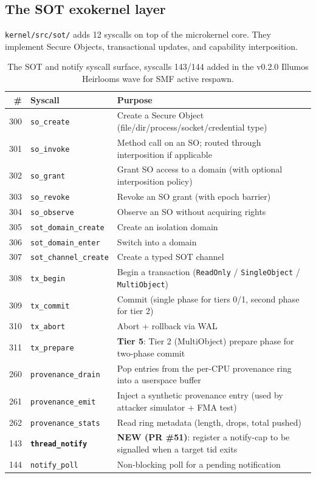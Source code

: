 \documentclass[11pt,a4paper]{article}
\begin{document}
\subsection{The SOT exokernel layer}

\texttt{kernel/src/sot/} adds 12 syscalls on top of the microkernel
core. They implement Secure Objects, transactional updates, and
capability interposition.

\begin{table}[h]
\centering
\small
\begin{tabularx}{\textwidth}{rlX}
\toprule
\# & Syscall & Purpose \\
\midrule
300 & \texttt{so\_create} & Create a Secure Object (file/dir/process/socket/credential type) \\
301 & \texttt{so\_invoke} & Method call on an SO; routed through interposition if applicable \\
302 & \texttt{so\_grant} & Grant SO access to a domain (with optional interposition policy) \\
303 & \texttt{so\_revoke} & Revoke an SO grant (with epoch barrier) \\
304 & \texttt{so\_observe} & Observe an SO without acquiring rights \\
305 & \texttt{sot\_domain\_create} & Create an isolation domain \\
306 & \texttt{sot\_domain\_enter} & Switch into a domain \\
307 & \texttt{sot\_channel\_create} & Create a typed SOT channel \\
308 & \texttt{tx\_begin} & Begin a transaction (\texttt{ReadOnly} / \texttt{SingleObject} / \texttt{MultiObject}) \\
309 & \texttt{tx\_commit} & Commit (single phase for tiers 0/1, second phase for tier 2) \\
310 & \texttt{tx\_abort} & Abort + rollback via WAL \\
311 & \texttt{tx\_prepare} & \textbf{Tier 5}: Tier 2 (MultiObject) prepare phase for two-phase commit \\
\midrule
260 & \texttt{provenance\_drain} & Pop entries from the per-CPU provenance ring into a userspace buffer \\
261 & \texttt{provenance\_emit} & Inject a synthetic provenance entry (used by attacker simulator + FMA test) \\
262 & \texttt{provenance\_stats} & Read ring metadata (length, drops, total pushed) \\
\midrule
143 & \textbf{\texttt{thread\_notify}} & \textbf{NEW (PR \#51)}: register a notify-cap to be signalled when a target tid exits \\
144 & \texttt{notify\_poll} & Non-blocking poll for a pending notification \\
\bottomrule
\end{tabularx}
\caption{The SOT and notify syscall surface, syscalls 143/144 added in the v0.2.0 Illumos Heirlooms wave for SMF active respawn.}
\end{table}
\end{document}
